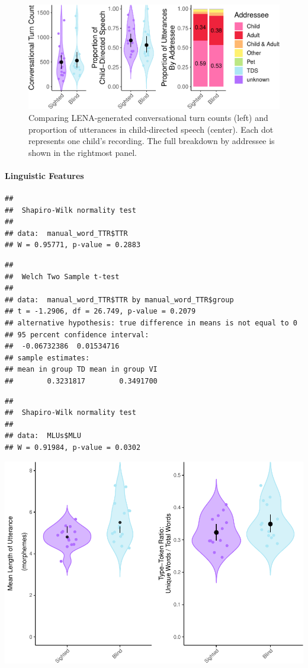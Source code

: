 \documentclass[
  man]{apa6}
\let\oldparagraph\paragraph
\renewcommand{\paragraph}[1]{\oldparagraph{#1}\mbox{}}
\begin{document}
\begin{figure}
\centering
\includegraphics{input_quality_manuscript_files/figure-latex/interactiveness-plots-1.pdf}
\caption{\label{fig:interactiveness-plots}Comparing LENA-generated conversational turn counts (left) and proportion of utterances in child-directed speech (center). Each dot represents one child's recording. The full breakdown by addressee is shown in the rightmost panel.}
\end{figure}

\hypertarget{linguistic-features}{%
\paragraph{Linguistic Features}\label{linguistic-features}}

\begin{verbatim}
## 
##  Shapiro-Wilk normality test
## 
## data:  manual_word_TTR$TTR
## W = 0.95771, p-value = 0.2883
\end{verbatim}

\begin{verbatim}
## 
##  Welch Two Sample t-test
## 
## data:  manual_word_TTR$TTR by manual_word_TTR$group
## t = -1.2906, df = 26.749, p-value = 0.2079
## alternative hypothesis: true difference in means is not equal to 0
## 95 percent confidence interval:
##  -0.06732386  0.01534716
## sample estimates:
## mean in group TD mean in group VI 
##        0.3231817        0.3491700
\end{verbatim}

\begin{verbatim}
## 
##  Shapiro-Wilk normality test
## 
## data:  MLUs$MLU
## W = 0.91984, p-value = 0.0302
\end{verbatim}

\includegraphics{input_quality_manuscript_files/figure-latex/linguistic-plots-1.pdf}
\end{document}
